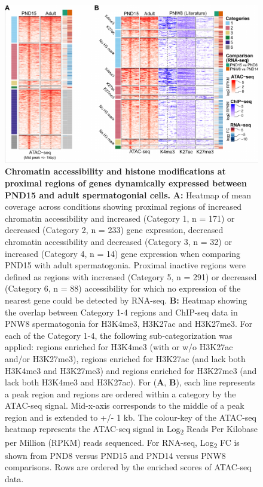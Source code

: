 \documentclass[12pt,twoside]{reedthesis}
\begin{document}
\begin{subfigures}


\begin{figure}[htbp]

{\centering \includegraphics{thesis_files/figure-latex/df3a-1} 

}

\caption[Chromatin accessibility and histone modifications at proximal regions of genes dynamically expressed between PND15 and adult spermatogonial cells]{\textbf{Chromatin accessibility and histone modifications at proximal regions of genes dynamically expressed between PND15 and adult spermatogonial cells.} \newline \textbf{A:} Heatmap of mean coverage across conditions showing proximal regions of increased chromatin accessibility and increased (Category 1, n = 171) or decreased (Category 2, n = 233) gene expression, decreased chromatin accessibility and decreased (Category 3, n = 32) or increased (Category 4, n = 14) gene expression when comparing PND15 with adult spermatogonia. Proximal inactive regions were defined as regions with increased (Category 5, n = 291) or decreased (Category 6, n = 88) accessibility for which no expression of the nearest gene could be detected by RNA-seq. \newline \textbf{B:} Heatmap showing the overlap between Category 1-4 regions and ChIP-seq data in PNW8 spermatogonia for H3K4me3, H3K27ac and H3K27me3. For each of the Category 1-4, the following sub-categorization was applied: regions enriched for H3K4me3 (with or w/o H3K27ac and/or H3K27me3), regions enriched for H3K27ac (and lack both H3K4me3 and H3K27me3) and regions enriched for H3K27me3 (and lack both H3K4me3 and H3K27ac). For (\textbf{A}, \textbf{B}), each line represents a peak region and regions are ordered within a category by the ATAC-seq signal. Mid-x-axis corresponds to the middle of a peak region and is extended to +/- 1 kb. The colour-key of the ATAC-seq heatmap represents the ATAC-seq signal in Log\textsubscript{2} Reads Per Kilobase per Million (RPKM) reads sequenced. For RNA-seq, Log\textsubscript{2} FC is shown from PND8 versus PND15 and PND14 versus PNW8 comparisons. Rows are ordered by the enriched scores of ATAC-seq data.}\label{fig:df3a}
\end{figure}


\end{subfigures}
\end{document}
